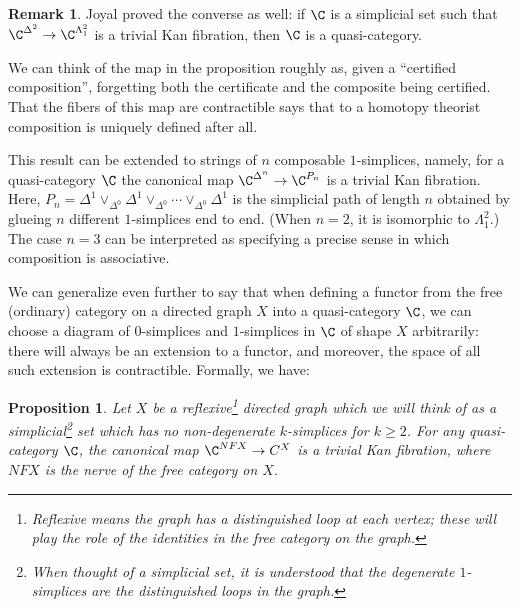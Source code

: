 \documentclass[12pt]{amsart}
\newtheorem{proposition}[theorem]{Proposition}
\theoremstyle{definition} \newtheorem{definition}[theorem]{Definition}
\newtheorem{remark}[theorem]{Remark}
\numberwithin{equation}{section}
\begin{document}
\begin{remark}
  Joyal proved the converse as well: if $\C$ is a simplicial set
  such that $\C^{\Delta^2} \to \C^{\Lambda^2_1}$ is a trivial Kan
  fibration, then $\C$ is a quasi-category.
\end{remark}

We can think of the map in the proposition roughly as, given a
``certified composition'', forgetting both the certificate and the
composite being certified. That the fibers of this map are
contractible says that to a homotopy theorist composition is uniquely
defined after all.

This result can be extended to strings of $n$ composable
$1$-simplices, namely, for a quasi-category $\C$ the canonical map
$\C^{\Delta^n} \to \C^{P_n}$ is a trivial Kan fibration. Here, $P_n =
\Delta^1 \vee_{\Delta^0} \Delta^1 \vee_{\Delta^0} \cdots
\vee_{\Delta^0} \Delta^1$ is the simplicial path of length $n$
obtained by glueing $n$ different $1$-simplices end to end. (When
$n=2$, it is isomorphic to $\Lambda^2_1$.) The case $n=3$ can be
interpreted as specifying a precise sense in which composition is
associative.

We can generalize even further to say that when defining a functor
from the free (ordinary) category on a directed graph $X$ into a
quasi-category $\C$, we can choose a diagram of $0$-simplices and
$1$-simplices in $\C$ of shape $X$ arbitrarily: there will always be
an extension to a functor, and moreover, the space of all such
extension is contractible. Formally, we have:

\begin{proposition}\label{freecats}
Let $X$ be a reflexive\footnote{Reflexive means
the graph has a distinguished loop at each vertex; these will play the
role of the identities in the free category on the graph.} directed
graph which we will think of as a simplicial\footnote{When thought of
a simplicial set, it is understood that the degenerate $1$-simplices
are the distinguished loops in the graph.} set which has no
non-degenerate $k$-simplices for $k \ge 2$. For any quasi-category
$\C$, the canonical map $\C^{NFX} \to C^X$ is a trivial Kan fibration,
where $NFX$ is the nerve of the free category on $X$.
\end{proposition}
\end{document}
